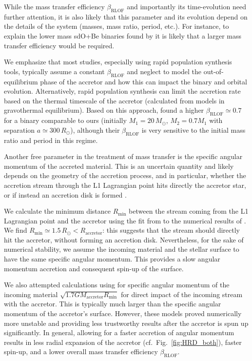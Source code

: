 \documentclass[twocolumn,twocolappendix,trackchanges]{aastex63}
\DeclareRobustCommand{\Figref}[1]{Fig.~\ref{#1}}
\begin{document}
While the mass transfer efficiency $\beta_\mathrm{RLOF}$ and
importantly its time-evolution need further attention, it is also
likely that this parameter and its evolution depend on the details of
the system (masses, mass ratio, period, etc.). For instance, to
explain the lower mass sdO+Be binaries found by \cite{wang:21_sdOBe} it is likely
that a larger mass transfer efficiency would be required.


We emphasize that most studies, especially using rapid population
synthesis tools, typically assume a constant $\beta_\mathrm{RLOF}$ and
neglect to model the out-of-equilibrium phase of the accretor and how
this can impact the binary and orbital evolution. Alternatively, rapid
population synthesis can limit the accretion rate based on the thermal
timescale of the accretor (calculated from models in gravothermal
equilibrium). Based on this approach, \cite{schneider:15} found a
higher $\beta_\mathrm{RLOF}\simeq 0.7$ for a binary comparable to ours
(initially $M_1=20\,M_\odot$, $M_2=0.7M_1$ with separation
$a\simeq300\,R_\odot$), although their $\beta_\mathrm{RLOF}$ is very
sensitive to the initial mass ratio and period in this regime.

Another free parameter in the treatment of mass transfer is the
specific angular momentum of the accreted material. This is an
uncertain quantity and likely depends on the geometry of the accretion
process, and in particular, whether the accretion stream through the
L1 Lagrangian point hits directly the accretor star, or if
instead an accretion disk is formed \citep[e.g.,][]{demink:13}.

We calculate the minimum distance $R_\mathrm{min}$ between the stream
coming from the L1 Lagrangian point and the accretor using the fit
from \cite{ulrich:76} to the numerical results of \cite{lubow:75}. We
find $R_\mathrm{min}\simeq 1.5\,R_\odot < R_\mathrm{accretor}$: this
suggests that the stream should directly hit the accretor, without
forming an accretion disk. Nevertheless, for the sake of numerical
stability, we assume the incoming material and the stellar surface to
have the same specific angular momentum. This provides a slow angular
momentum accretion and consequent spin-up of the surface.

We also attempted calculations using for specific angular momentum of
the incoming material $\sqrt{1.7GM_\mathrm{accretor}R_\mathrm{min}}$
\citep{lubow:75} for direct impact of the incoming stream with the
accretor. This is typically much larger than
the specific angular momentum of the accretor's surface. However,
these models proved numerically more unstable and providing less
trustworthy results after the accretor is spun up
significantly. In general, allowing for a faster accretion of
angular momentum results in less radial expansion of the accretor
(cf.~\Figref{fig:HRD_both}), faster spin-up, and a lower overall mass
transfer efficiency $\beta_\mathrm{RLOF}$.
\end{document}
